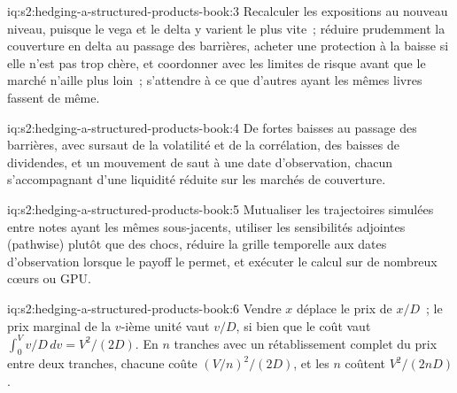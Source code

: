 \begin{solution}{iq:s2:hedging-a-structured-products-book:3}
Recalculer les expositions au nouveau niveau, puisque le vega et le delta y varient le plus vite~; réduire prudemment la couverture en delta au passage des barrières, acheter
une protection à la baisse si elle n'est pas trop chère, et coordonner avec les limites de risque avant que le marché n'aille plus loin~; s'attendre à ce que d'autres ayant les
mêmes livres fassent de même.
\end{solution}

\begin{solution}{iq:s2:hedging-a-structured-products-book:4}
De fortes baisses au passage des barrières, avec sursaut de la volatilité et de la corrélation, des baisses de dividendes, et un mouvement de saut à une date d'observation, chacun s'accompagnant
d'une liquidité réduite sur les marchés de couverture.
\end{solution}

\begin{solution}{iq:s2:hedging-a-structured-products-book:5}
Mutualiser les trajectoires simulées entre notes ayant les mêmes sous-jacents, utiliser les sensibilités adjointes (pathwise) plutôt que des chocs, réduire la grille temporelle aux
dates d'observation lorsque le payoff le permet, et exécuter le calcul sur de nombreux cœurs ou GPU.
\end{solution}

\begin{solution}{iq:s2:hedging-a-structured-products-book:6}
Vendre $x$ déplace le prix de $x/D$~; le prix marginal de la $v$-ième unité vaut $v/D$, si bien que le coût vaut $\int_0^V v/D\,dv = V^2/(2D)$. En $n$ tranches
avec un rétablissement complet du prix entre deux tranches, chacune coûte $(V/n)^2/(2D)$, et les $n$ coûtent $V^2/(2nD)$.
\end{solution}

